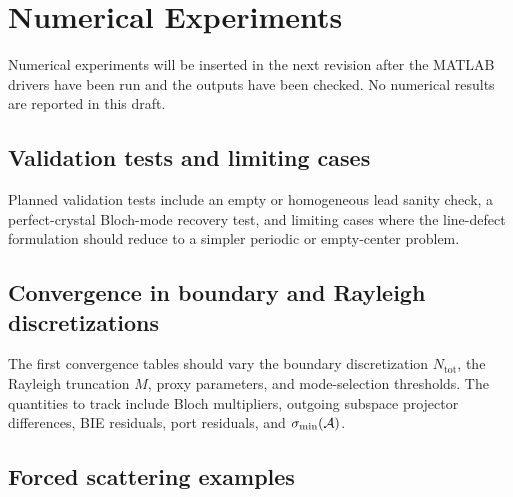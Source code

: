 %
%
%
%
%

\section{Numerical Experiments}

Numerical experiments will be inserted in the next revision after the MATLAB
drivers have been run and the outputs have been checked.  No numerical results
are reported in this draft.

\subsection{Validation tests and limiting cases}

Planned validation tests include an empty or homogeneous lead sanity check, a
perfect-crystal Bloch-mode recovery test, and limiting cases where the
line-defect formulation should reduce to a simpler periodic or empty-center
problem.


\subsection{Convergence in boundary and Rayleigh discretizations}

The first convergence tables should vary the boundary discretization
\(N_{\mathrm{tot}}\), the Rayleigh truncation \(M\), proxy parameters, and
mode-selection thresholds.  The quantities to track include Bloch multipliers,
outgoing subspace projector differences, BIE residuals, port residuals, and
\(\sigma_{\min}(\mathcal A)\).


\subsection{Forced scattering examples}

